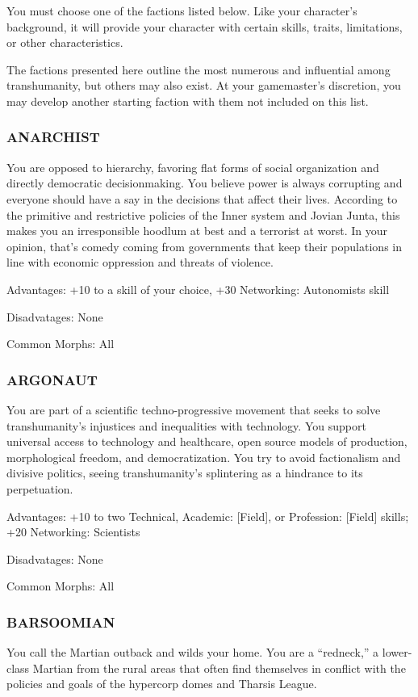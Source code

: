 You must choose one of the factions listed below.  Like your character’s
background, it will provide your character with certain skills, traits,
limitations, or other characteristics.

The factions presented here outline the most numerous and influential among
transhumanity, but others may also exist. At your gamemaster’s discretion, you
may develop another starting faction with them not included on this list.

\subsubsection{ANARCHIST}
You are opposed to hierarchy, favoring flat forms of social organization and
directly democratic decisionmaking. You believe power is always corrupting and
everyone should have a say in the decisions that affect their lives. According
to the primitive and restrictive policies of the Inner system and Jovian Junta,
this makes you an irresponsible hoodlum at best and a terrorist at worst. In
your opinion, that’s comedy coming from governments that keep their populations
in line with economic oppression and threats of violence.

Advantages: +10 to a skill of your choice, +30 Networking: Autonomists skill

Disadvatages: None

Common Morphs: All

\subsubsection{ARGONAUT}
You are part of a scientific techno-progressive movement that seeks to solve
transhumanity’s injustices and inequalities with technology. You support
universal access to technology and healthcare, open source models of
production, morphological freedom, and democratization. You try to avoid
factionalism and divisive politics, seeing transhumanity’s splintering as a
hindrance to its perpetuation.

Advantages: +10 to two Technical, Academic: [Field], or Profession: [Field]
skills; +20 Networking: Scientists

Disadvatages: None

Common Morphs: All

\subsubsection{BARSOOMIAN}
You call the Martian outback and wilds your home.  You are a “redneck,” a
lower-class Martian from the rural areas that often find themselves in conflict
with the policies and goals of the hypercorp domes and Tharsis League.

